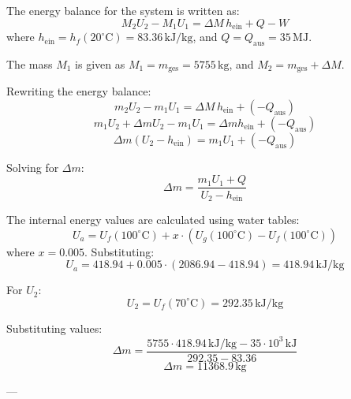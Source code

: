 The energy balance for the system is written as:  
\[
M_2 U_2 - M_1 U_1 = \Delta M \, h_{\text{ein}} + Q - W
\]  
where \( h_{\text{ein}} = h_f(20^\circ\text{C}) = 83.36 \, \text{kJ/kg} \), and \( Q = Q_{\text{aus}} = 35 \, \text{MJ} \).  

The mass \( M_1 \) is given as \( M_1 = m_{\text{ges}} = 5755 \, \text{kg} \), and \( M_2 = m_{\text{ges}} + \Delta M \).  

Rewriting the energy balance:  
\[
m_2 U_2 - m_1 U_1 = \Delta M \, h_{\text{ein}} + (-Q_{\text{aus}})
\]  
\[
m_1 U_2 + \Delta m U_2 - m_1 U_1 = \Delta m h_{\text{ein}} + (-Q_{\text{aus}})
\]  
\[
\Delta m (U_2 - h_{\text{ein}}) = m_1 U_1 + (-Q_{\text{aus}})
\]  

Solving for \( \Delta m \):  
\[
\Delta m = \frac{m_1 U_1 + Q}{U_2 - h_{\text{ein}}}
\]  

The internal energy values are calculated using water tables:  
\[
U_a = U_f(100^\circ\text{C}) + x \cdot (U_g(100^\circ\text{C}) - U_f(100^\circ\text{C}))
\]  
where \( x = 0.005 \). Substituting:  
\[
U_a = 418.94 + 0.005 \cdot (2086.94 - 418.94) = 418.94 \, \text{kJ/kg}
\]  

For \( U_2 \):  
\[
U_2 = U_f(70^\circ\text{C}) = 292.35 \, \text{kJ/kg}
\]  

Substituting values:  
\[
\Delta m = \frac{5755 \cdot 418.94 \, \text{kJ/kg} - 35 \cdot 10^3 \, \text{kJ}}{292.35 - 83.36}
\]  
\[
\Delta m = 11368.9 \, \text{kg}
\]  

---